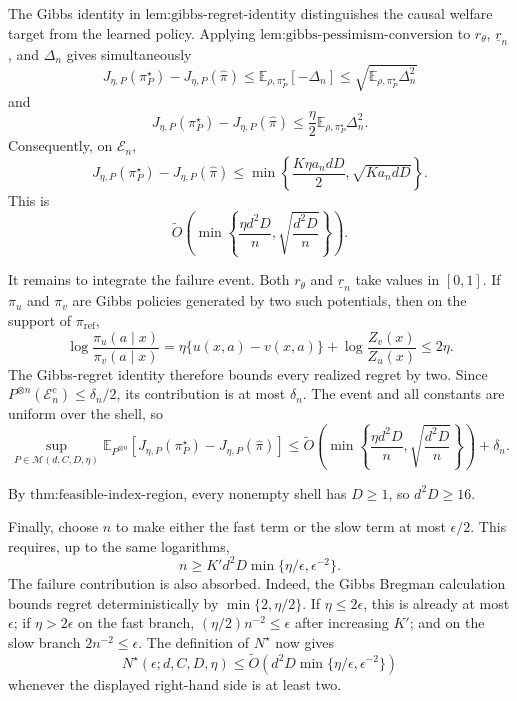 The Gibbs identity in \(\text{lem:gibbs-regret-identity}\) distinguishes the causal welfare target from the learned policy. Applying \(\text{lem:gibbs-pessimism-conversion}\) to \(r_\theta\), \(\underline r_n\), and \(\Delta_n\) gives simultaneously
\[
J_{\eta,P}(\pi_P^\star)-J_{\eta,P}(\widehat\pi)
\le \mathbb E_{\rho,\pi_P^\star}[-\Delta_n]
\le \sqrt{\mathbb E_{\rho,\pi_P^\star}\Delta_n^2}
\]
and
\[
J_{\eta,P}(\pi_P^\star)-J_{\eta,P}(\widehat\pi)
\le\frac{\eta}{2}\mathbb E_{\rho,\pi_P^\star}\Delta_n^2.
\]
Consequently, on \(\mathcal E_n\),
\[
J_{\eta,P}(\pi_P^\star)-J_{\eta,P}(\widehat\pi)
\le
\min\left\{\frac{K\eta a_ndD}{2},\sqrt{Ka_ndD}\right\}.
\]
This is
\[
\widetilde O\left(\min\left\{\frac{\eta d^2D}{n},\sqrt{\frac{d^2D}{n}}\right\}\right).
\]

It remains to integrate the failure event. Both \(r_\theta\) and \(\underline r_n\) take values in \([0,1]\). If \(\pi_u\) and \(\pi_v\) are Gibbs policies generated by two such potentials, then on the support of \(\pi_{\mathrm{ref}}\),
\[
\log\frac{\pi_u(a\mid x)}{\pi_v(a\mid x)}
=\eta\{u(x,a)-v(x,a)\}+\log\frac{Z_v(x)}{Z_u(x)}\le2\eta.
\]
The Gibbs-regret identity therefore bounds every realized regret by two. Since \(P^{\otimes n}(\mathcal E_n^c)\le\delta_n/2\), its contribution is at most \(\delta_n\). The event and all constants are uniform over the shell, so
\[
\sup_{P\in\mathcal M(d,C,D,\eta)}
\mathbb E_{P^{\otimes n}}
\left[J_{\eta,P}(\pi_P^\star)-J_{\eta,P}(\widehat\pi)\right]
\le
\widetilde O\left(
\min\left\{\frac{\eta d^2D}{n},\sqrt{\frac{d^2D}{n}}\right\}
\right)+\delta_n.
\]

By \(\text{thm:feasible-index-region}\), every nonempty shell has \(D\ge1\), so \(d^2D\ge16\).

Finally, choose \(n\) to make either the fast term or the slow term at most \(\epsilon/2\). This requires, up to the same logarithms,
\[
n\ge K' d^2D\min\{\eta/\epsilon,\epsilon^{-2}\}.
\]
The failure contribution is also absorbed. Indeed, the Gibbs Bregman calculation bounds regret deterministically by \(\min\{2,\eta/2\}\). If \(\eta\le2\epsilon\), this is already at most \(\epsilon\); if \(\eta>2\epsilon\) on the fast branch, \((\eta/2)n^{-2}\le\epsilon\) after increasing \(K'\); and on the slow branch \(2n^{-2}\le\epsilon\). The definition of \(N^\star\) now gives
\[
N^\star(\epsilon;d,C,D,\eta)
\le\widetilde O\left(d^2D\min\{\eta/\epsilon,\epsilon^{-2}\}\right)
\]
whenever the displayed right-hand side is at least two.